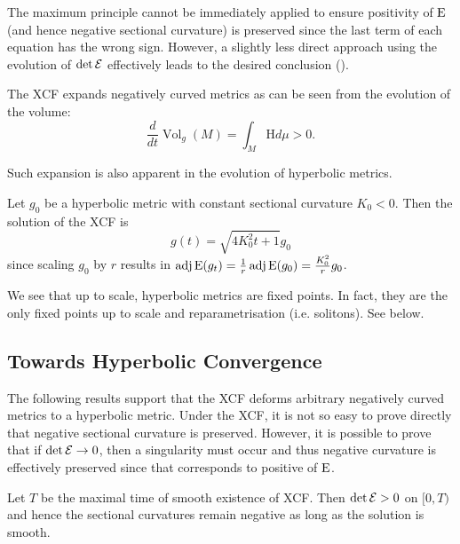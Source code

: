 \documentclass[a4paper,12pt]{amsart}
\begin{document}
The maximum principle cannot be immediately applied to ensure positivity of \(\operatorname{E}\) (and hence negative sectional curvature) is preserved since the last term of each equation has the wrong sign. However, a slightly less direct approach using the evolution of \(\det \operatorname{\mathcal{E}}\) effectively leads to the desired conclusion ().

The XCF expands negatively curved metrics as can be seen from the evolution of the volume:
\begin{equation}
\label{eq:dtvol}
\frac{d}{dt} \operatorname{Vol}_g (M) = \int_M \mathrm{H}d\mu > 0.
\end{equation}

Such expansion is also apparent in the evolution of hyperbolic metrics.
\begin{example}
\label{eq:hyperbolic}

Let \(g_0\) be a hyperbolic metric with constant sectional curvature \(K_0 < 0\). Then the solution of the XCF is
\[
g(t) = \sqrt{4K_0^2 t + 1} g_0
\]
since scaling \(g_0\) by \(r\) results in \(\operatorname{adj}\operatorname{E}(g_t) = \frac{1}{r} \operatorname{adj}\operatorname{E}(g_0) = \frac{K_0^2}{r} g_0\).
\end{example}

We see that up to scale, hyperbolic metrics are fixed points. In fact, they are the only fixed points up to scale and reparametrisation (i.e. solitons). See  below.

\subsection{Towards Hyperbolic Convergence}
\label{subsec:xcf_hyperbolic_convergence}

The following results support  that the XCF deforms arbitrary negatively curved metrics to a hyperbolic metric. Under the XCF, it is not so easy to prove directly that negative sectional curvature is preserved. However, it is possible to prove that if \(\det \operatorname{\mathcal{E}} \to 0\), then a singularity must occur and thus negative curvature is effectively preserved since that corresponds to positive of \(\operatorname{E}\).

\begin{prop}[{\cite[p. 8]{MR2055396}}]
\label{prop:negative_perserved}

Let $T$ be the maximal time of smooth existence of XCF. Then \(\det \operatorname{\mathcal{E}} > 0\) on \([0, T)\) and hence the sectional curvatures remain negative as long as the solution is smooth.
\end{prop}
\end{document}

